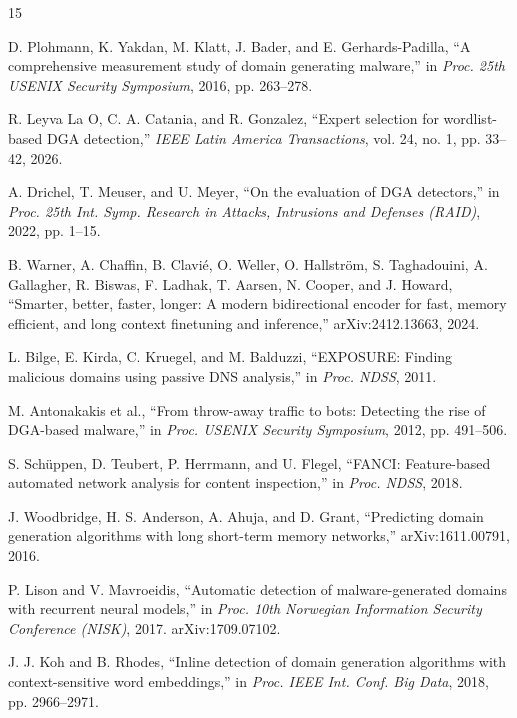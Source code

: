 \documentclass[conference]{IEEEtran}
\begin{document}
\begin{thebibliography}{15}

D. Plohmann, K. Yakdan, M. Klatt, J. Bader, and E. Gerhards-Padilla, ``A comprehensive measurement study of domain generating malware,'' in \emph{Proc. 25th USENIX Security Symposium}, 2016, pp. 263--278.

R. Leyva La O, C. A. Catania, and R. Gonzalez, ``Expert selection for wordlist-based DGA detection,'' \emph{IEEE Latin America Transactions}, vol. 24, no. 1, pp. 33--42, 2026.

A. Drichel, T. Meuser, and U. Meyer, ``On the evaluation of DGA detectors,'' in \emph{Proc. 25th Int. Symp. Research in Attacks, Intrusions and Defenses (RAID)}, 2022, pp. 1--15.

B. Warner, A. Chaffin, B. Clavi\'e, O. Weller, O. Hallstr\"om, S. Taghadouini, A. Gallagher, R. Biswas, F. Ladhak, T. Aarsen, N. Cooper, and J. Howard, ``Smarter, better, faster, longer: A modern bidirectional encoder for fast, memory efficient, and long context finetuning and inference,'' arXiv:2412.13663, 2024.

L. Bilge, E. Kirda, C. Kruegel, and M. Balduzzi, ``EXPOSURE: Finding malicious domains using passive DNS analysis,'' in \emph{Proc. NDSS}, 2011.

M. Antonakakis et al., ``From throw-away traffic to bots: Detecting the rise of DGA-based malware,'' in \emph{Proc. USENIX Security Symposium}, 2012, pp. 491--506.

S. Sch\"uppen, D. Teubert, P. Herrmann, and U. Flegel, ``FANCI: Feature-based automated network analysis for content inspection,'' in \emph{Proc. NDSS}, 2018.

J. Woodbridge, H. S. Anderson, A. Ahuja, and D. Grant, ``Predicting domain generation algorithms with long short-term memory networks,'' arXiv:1611.00791, 2016.

P. Lison and V. Mavroeidis, ``Automatic detection of malware-generated domains with recurrent neural models,'' in \emph{Proc. 10th Norwegian Information Security Conference (NISK)}, 2017. arXiv:1709.07102.

J. J. Koh and B. Rhodes, ``Inline detection of domain generation algorithms with context-sensitive word embeddings,'' in \emph{Proc. IEEE Int. Conf. Big Data}, 2018, pp. 2966--2971.


\end{thebibliography}
\end{document}
